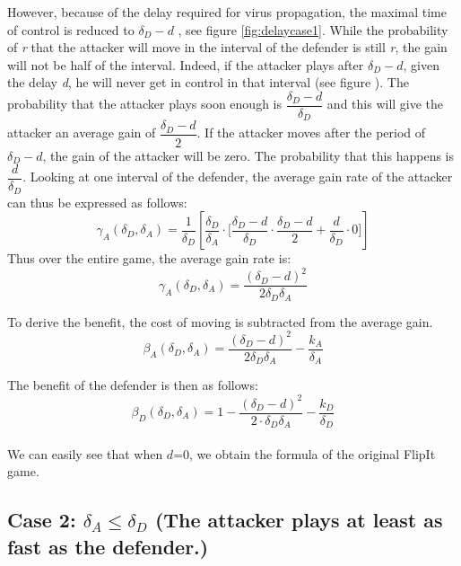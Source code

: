 However, because of the delay required for virus propagation, the maximal time of control is reduced to $\delta_{D}-d$ , see figure \ref{fig:delaycase1}. While the probability of \textit{r} that the attacker will move in the interval of the defender is still \textit{r}, the gain will not be half of the interval. Indeed, if the attacker plays after $\delta_{D}-d$, given the delay \textit{d}, he will never get in control in that interval (see figure ). The probability that the attacker plays soon enough is $\dfrac{\delta_{D}-d}{\delta_{D}}$ and this will give the attacker an average gain of $\dfrac{\delta_{D}-d}{2}$. If the attacker moves after the period of $\delta_{D}-d$, the gain of the attacker will be zero. The probability that this happens is  $\dfrac{d}{\delta_{D}}$. Looking at one interval of the defender, the average gain rate of the attacker can thus be expressed as follows:
\begin{equation*}
\gamma_{A}(\delta_{D},\delta_{A}) = \dfrac {1}{\delta_{D}} [ \dfrac{\delta_{D}}{\delta_{A}} \cdot \big[ \dfrac{\delta_{D}-d}{\delta_{D}} \cdot \dfrac{\delta_{D}-d}{2} + \dfrac{d}{\delta_{D}} \cdot 0 \big] ]
\end{equation*}
Thus over the entire game, the average gain rate is:
\begin{equation*}
\gamma_{A}(\delta_{D},\delta_{A}) = \dfrac{(\delta_{D} -d)^{2}}{2\delta_{D}\delta_{A}}
\end{equation*}

To derive the benefit, the cost of moving is subtracted from the average gain. 
\begin{equation*}
\beta_{A}(\delta_{D},\delta_{A}) = \dfrac { (\delta_{D}-d) ^{2}} {2 \delta_{D}  \delta_{A}} - \dfrac{k_{A}}{\delta_{A}}
\end{equation*}

 
 The benefit of the defender is then as follows:
\begin{equation*}
\beta_{D}(\delta_{D},\delta_{A}) = 1 - \dfrac { (\delta_{D}-d) ^{2}} {2 \cdot \delta_{D}  \delta_{A}} - \dfrac{k_{D}}{ \delta_{D}}
\end{equation*}
~~\\
We can easily see that when $d$=0, we obtain the formula of the original FlipIt game.\\





\subsection*{\textbf{Case 2:} $\delta_{A} \leq \delta_{D} $ (The attacker plays at least as fast as the defender.) }

